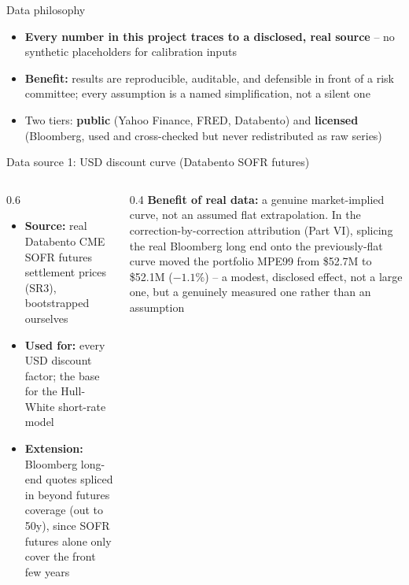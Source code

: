\documentclass[8pt,aspectratio=169]{beamer}
\begin{document}
\begin{frame}{Data philosophy}
  \begin{itemize}
    \item \textbf{Every number in this project traces to a disclosed, real source} -- no synthetic placeholders for calibration inputs
    \item \textbf{Benefit:} results are reproducible, auditable, and defensible in front of a risk committee; every assumption is a named simplification, not a silent one
    \item Two tiers: \textbf{public} (Yahoo Finance, FRED, Databento) and \textbf{licensed} (Bloomberg, used and cross-checked but never redistributed as raw series)
  \end{itemize}
\end{frame}

\begin{frame}{Data source 1: USD discount curve (Databento SOFR futures)}
  \begin{columns}[T]
    \begin{column}{0.6\textwidth}
      \begin{itemize}
        \item \textbf{Source:} real Databento CME SOFR futures settlement prices (SR3), bootstrapped ourselves
        \item \textbf{Used for:} every USD discount factor; the base for the Hull-White short-rate model
        \item \textbf{Extension:} Bloomberg long-end quotes spliced in beyond futures coverage (out to 50y), since SOFR futures alone only cover the front few years
      \end{itemize}
    \end{column}
    \begin{column}{0.4\textwidth}
      \small
      \textbf{Benefit of real data:} a genuine market-implied curve, not an assumed flat extrapolation. In the correction-by-correction attribution (Part VI), splicing the real Bloomberg long end onto the previously-flat curve moved the portfolio MPE99 from \$52.7M to \$52.1M ($-1.1\%$) -- a modest, disclosed effect, not a large one, but a genuinely measured one rather than an assumption
    \end{column}
  \end{columns}
\end{frame}
\end{document}
